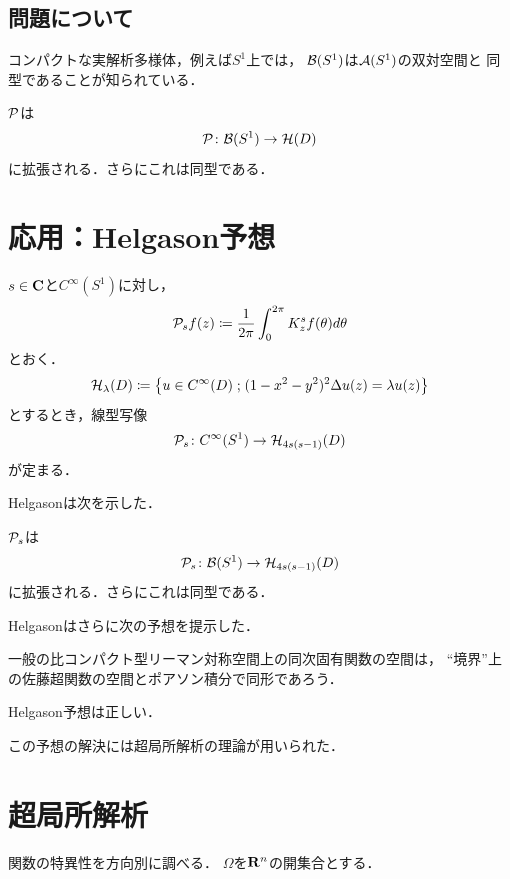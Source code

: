 \subsection{問題について}

コンパクトな実解析多様体，例えば\(S^1\)上では，
\(\mathcal{B}(S^1)\)は\(\mathcal{A}(S^1)\)の双対空間と
同型であることが知られている．
\begin{THM}
  \(\mathcal{P}\)は\[
    \mathcal{P}\colon \mathcal{B}(S^1)\to \mathcal{H}(D)
  \]
  に拡張される．さらにこれは同型である．
\end{THM}
\section{応用：Helgason予想}
\(s\in\mathbf{C}\)と\(C^{\infty}(S^1)\)に対し，
\[
  \mathcal{P}_{s}f(z)\coloneqq \frac{1}{2\pi}\int_{0}^{2\pi}K_{z}^{s}f(\theta)d\theta
\]
とおく．
\[
  \mathcal{H}_{\lambda}(D)
  \coloneqq
  \left\{
    u\in C^{\infty}(D)\mathrel{;}
    (1-x^2-y^2)^2\Delta{u}(z)=\lambda u(z)
  \right\}
\]
とするとき，線型写像
\[
  \mathcal{P}_{s}\colon C^{\infty}(S^1)\to
  \mathcal{H}_{4s(s-1)}(D)
\]
が定まる．

Helgasonは次を示した．
\begin{THM}[Helgason, 1970]
  \(\mathcal{P}_{s}\)は\[
    \mathcal{P}_{s}\colon \mathcal{B}(S^1)\to \mathcal{H}_{4s(s-1)}(D)
  \]
  に拡張される．さらにこれは同型である．
\end{THM}

Helgasonはさらに次の予想を提示した．
\begin{CNJ}[Helgason予想]
  一般の比コンパクト型リーマン対称空間上の同次固有関数の空間は，
  ``境界''上の佐藤超関数の空間とポアソン積分で同形であろう．
\end{CNJ}

\begin{THM}
  Helgason予想は正しい．
\end{THM}
この予想の解決には超局所解析の理論が用いられた．

\section{超局所解析}

関数の特異性を方向別に調べる．
\(\varOmega\)を\(\mathbf{R}^n\)の開集合とする．


